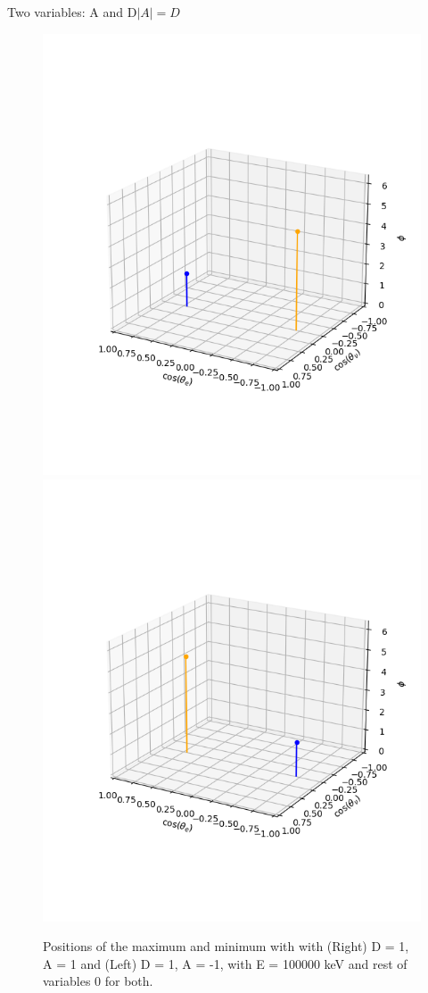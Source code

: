 \documentclass{beamer}
\begin{document}
\begin{frame}{Two variables: A and D}{$|A|= D$}
	\begin{figure}
		\centering
		\includegraphics[width=0.4\paperwidth]{plots/posD_eqposA_max_min}
		\includegraphics[width=0.4\paperwidth]{plots/posD_eqnegA_max_min}
		\caption{Positions of the maximum and minimum with with (Right) D = 1, A = 1 and (Left) D = 1, A = -1, with E = 100000 keV and rest of variables 0 for both.}
	\end{figure}
\end{frame}
\end{document}
